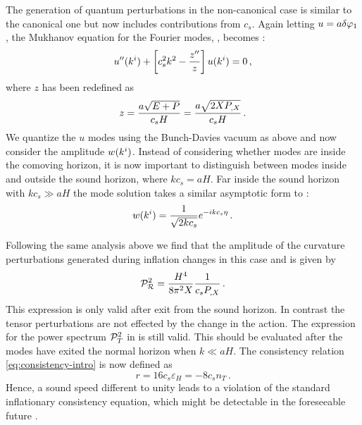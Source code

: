 The generation of quantum perturbations in the non-canonical case is similar to
the canonical one but now includes contributions from $c_s$. Again letting
$u=a\delta\varphi_{1}$, the Mukhanov equation for the
Fourier modes, , becomes
\cite{gm}:
% 
\begin{equation}
 u''(k^i) + \left[c_s^2 k^2 - \frac{z''}{z}\right] u(k^i) = 0\,,
\end{equation}
% 
where $z$ has been redefined as
% 
\begin{equation}
 z = \frac{a\sqrt{E+P}}{c_s H} = \frac{a\sqrt{2XP_{,X}}}{c_s H} \,.
\end{equation}
% 
We quantize the $u$ modes using the Bunch-Davies vacuum as above and now
consider the amplitude $w(k^i)$. Instead of considering whether modes are
inside the comoving horizon, it is now important to distinguish between modes
inside and outside the sound horizon, where $kc_s = aH$. Far inside the sound
horizon with $kc_s \gg aH$ the mode solution takes a similar asymptotic form to
:
% 
\begin{equation}
 w(k^i) = \frac{1}{\sqrt{2kc_s}} e^{-ikc_s \eta}\,.
\end{equation}


Following the same analysis above we find that the amplitude of the curvature 
perturbations 
generated during inflation changes in this case and is given by \cite{gm}
% 
\begin{equation} 
\label{eq:Ps-dbiintro}
 \mathcal{P}_{\mathcal{R}}^2  = \frac{H^4}{8\pi^2 X}\frac{1}{c_s P_{,X}} \,.
\end{equation}
% 
This expression is only valid after exit from the sound horizon. In contrast
the tensor perturbations are not effected by the change in the action. The
expression for the power spectrum $\mathcal{P}_T^2$ in  is still valid.
This should be evaluated after the modes have exited the normal horizon
when $k\ll aH$. 
The consistency relation \eqref{eq:consistency-intro} is now defined as
\cite{gm} 
% 
\begin{equation}
\label{eq:rdefn-dbiintro}
  r = 16c_s \varepsilon_H = -8c_s n_T \,.
\end{equation}
% 
Hence, a sound speed different to unity leads to a violation of the 
standard inflationary consistency equation, which might be 
detectable in the foreseeable future \cite{lidser1,lidser2}. 




